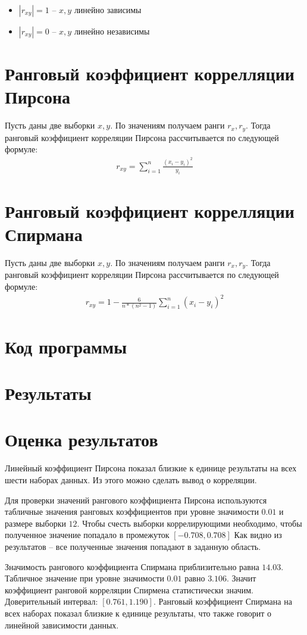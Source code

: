     \begin{itemize}
        \item $|r_{xy}| = 1$ -- $x, y$ линейно зависимы
        \item $|r_{xy}| = 0$ -- $x, y$ линейно независимы
    \end{itemize}
\section{Ранговый коэффициент коррелляции Пирсона}
    Пусть даны две выборки $x, y$.
    По значениям получаем ранги $r_x, r_y$.
    Тогда ранговый коэффициент корреляции Пирсона рассчитывается по следующей формуле:
    \begin{gather}
        r_{xy} = \sum_{i=1}^n\frac{(x_i - y_i)^2}{y_i}
    \end{gather}
\section{Ранговый коэффициент коррелляции Спирмана}
    Пусть даны две выборки $x, y$.
    По значениям получаем ранги $r_x, r_y$.
    Тогда ранговый коэффициент корреляции Пирсона рассчитывается по следующей формуле:
    \begin{gather}
        r_{xy} = 1 - \frac6{n*(n^2 - 1)}\sum_{i=1}^n(x_i - y_i)^2
    \end{gather}
\newline


\section{Код программы}
    

\section{Результаты}
    

\section{Оценка результатов}
    Линейный коэффициент Пирсона показал близкие к единице результаты на всех шести наборах данных.
    Из этого можно сделать вывод о корреляции.
    
    Для проверки значений рангового коэффициента Пирсона используются табличные значения ранговых коэффициентов при уровне значимости $0.01$ и размере выборки $12$.
    Чтобы счесть выборки коррелирующими необходимо, чтобы полученное значение попадало в промежуток $[-0.708, 0.708]$
    Как видно из результатов -- все полученные значения попадают в заданную область.

    Значимость рангового коэффициента Спирмана приблизительно равна $14.03$. 
    Табличное значение при уровне значимости $0.01$ равно $3.106$.
    Значит коэффициент ранговой корреляции Спирмена статистически значим.
    Доверительный интервал: $[0.761, 1.190]$.
    Ранговый коэффициент Спирмана на всех наборах показал близкие к единице результаты, что также говорит о линейной зависимости данных.